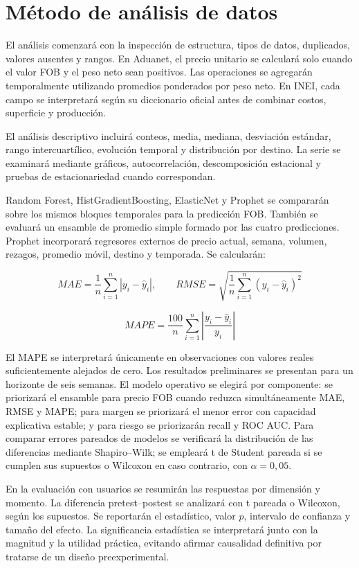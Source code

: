 \section{Método de análisis de datos}

El análisis comenzará con la inspección de estructura, tipos de datos, duplicados, valores ausentes y rangos. En Aduanet, el precio unitario se calculará solo cuando el valor FOB y el peso neto sean positivos. Las operaciones se agregarán temporalmente utilizando promedios ponderados por peso neto. En INEI, cada campo se interpretará según su diccionario oficial antes de combinar costos, superficie y producción.

El análisis descriptivo incluirá conteos, media, mediana, desviación estándar, rango intercuartílico, evolución temporal y distribución por destino. La serie se examinará mediante gráficos, autocorrelación, descomposición estacional y pruebas de estacionariedad cuando correspondan.

Random Forest, HistGradientBoosting, ElasticNet y Prophet se compararán sobre los mismos bloques temporales para la predicción FOB. También se evaluará un ensamble de promedio simple formado por las cuatro predicciones. Prophet incorporará regresores externos de precio actual, semana, volumen, rezagos, promedio móvil, destino y temporada. Se calcularán:

\[
MAE=\frac{1}{n}\sum_{i=1}^{n}|y_i-\hat y_i|,
\qquad
RMSE=\sqrt{\frac{1}{n}\sum_{i=1}^{n}(y_i-\hat y_i)^2}
\]

\[
MAPE=\frac{100}{n}\sum_{i=1}^{n}\left|\frac{y_i-\hat y_i}{y_i}\right|
\]

El MAPE se interpretará únicamente en observaciones con valores reales suficientemente alejados de cero. Los resultados preliminares se presentan para un horizonte de seis semanas. El modelo operativo se elegirá por componente: se priorizará el ensamble para precio FOB cuando reduzca simultáneamente MAE, RMSE y MAPE; para margen se priorizará el menor error con capacidad explicativa estable; y para riesgo se priorizarán recall y ROC AUC. Para comparar errores pareados de modelos se verificará la distribución de las diferencias mediante Shapiro--Wilk; se empleará t de Student pareada si se cumplen sus supuestos o Wilcoxon en caso contrario, con $\alpha=0,05$.

En la evaluación con usuarios se resumirán las respuestas por dimensión y momento. La diferencia pretest--postest se analizará con t pareada o Wilcoxon, según los supuestos. Se reportarán el estadístico, valor $p$, intervalo de confianza y tamaño del efecto. La significancia estadística se interpretará junto con la magnitud y la utilidad práctica, evitando afirmar causalidad definitiva por tratarse de un diseño preexperimental.
